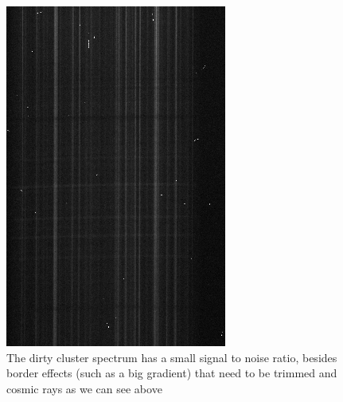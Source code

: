 \begin{figure}[h]
  \centering
  \begin{minipage}[b]{0.45\textwidth}
    \includegraphics[width=\textwidth]{images/cluster_dirty.png}
    \caption{The dirty cluster spectrum has a small signal to noise ratio, besides border effects (such as a big gradient) that need to be trimmed and cosmic rays as we can see above}
  \end{minipage}
  \hfill
  \begin{minipage}[b]{0.45\textwidth}

\end{minipage}
\end{figure}
